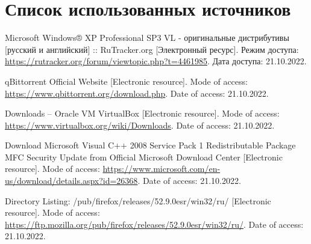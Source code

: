 \newpage

\begingroup
  \section*{Список использованных источников}

  \renewcommand{\addcontentsline}[3]{}%
  \renewcommand{\section}[2]{}%

  \begin{thebibliography}{}
    Microsoft Windows® XP Professional SP3 VL - оригинальные дистрибутивы [русский и английский] :: RuTracker.org
    [Электронный ресурс].
    Режим доступа: \url{https://rutracker.org/forum/viewtopic.php?t=4461985}.
    Дата доступа: 21.10.2022.

    qBittorrent Official Website
    [Electronic resource].
    Mode of access: \url{https://www.qbittorrent.org/download.php}.
    Date of access: 21.10.2022.

    Downloads – Oracle VM VirtualBox
    [Electronic resource].
    Mode of access: \url{https://www.virtualbox.org/wiki/Downloads}.
    Date of access: 21.10.2022.

    Download Microsoft Visual C++ 2008 Service Pack 1 Redistributable Package MFC Security Update from Official Microsoft Download Center
    [Electronic resource].
    Mode of access: \url{https://www.microsoft.com/en-us/download/details.aspx?id=26368}.
    Date of access: 21.10.2022.

    Directory Listing: /pub/firefox/releases/52.9.0esr/win32/ru/
    [Electronic resource].
    Mode of access: \url{https://ftp.mozilla.org/pub/firefox/releases/52.9.0esr/win32/ru/}.
    Date of access: 21.10.2022.
  \end{thebibliography}
\endgroup


\begingroup
  \section*{Литература, чтобы писать в \LaTeX}
  \addcontentsline{toc}{section}{Литература, чтобы писать в \LaTeX}

